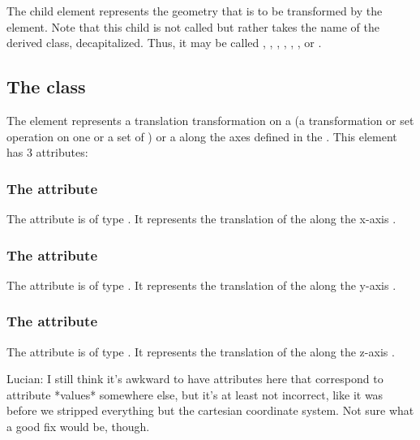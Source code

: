 The child  element represents the geometry that is to be transformed by the \CSGTransformation element.  Note that this child is not called  but rather takes the name of the derived class, decapitalized.  Thus, it may be called , , , , , , or .


\subsection{The  class}
\label{CSGTranslation-class}
The \CSGTranslation element represents a translation transformation on a \CSGNode (a transformation or set operation on one or a set of \CSGPrimitives) or a \CSGPrimitive along the axes defined in the \Geometry. This element has 3 attributes:

\subsubsection{The  attribute}
The  attribute is of type . It represents the translation of the \CSGNode along the x-axis .

\subsubsection{The  attribute}
The  attribute is of type . It represents the translation of the \CSGNode along the y-axis .

\subsubsection{The  attribute}
The  attribute is of type . It represents the translation of the \CSGNode along the z-axis .

{\color{red} Lucian: \notice I still think it's awkward to have attributes here that correspond to attribute *values* somewhere else, but it's at least not incorrect, like it was before we stripped everything but the cartesian coordinate system.  Not sure what a good fix would be, though.}

